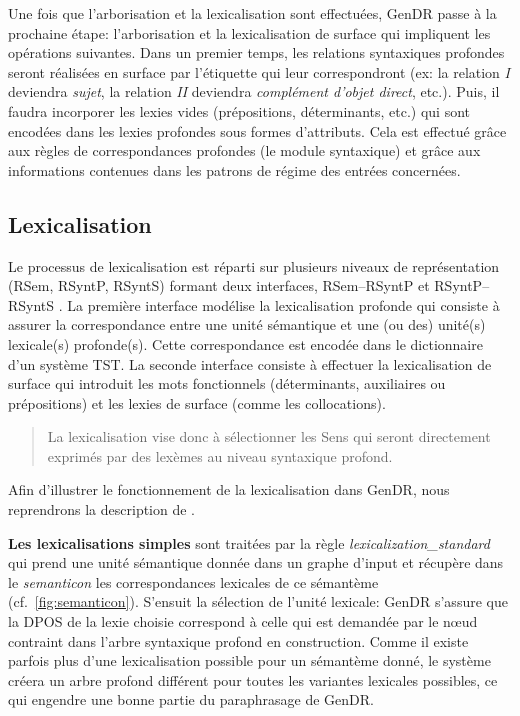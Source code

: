 Une fois que l'arborisation et la lexicalisation sont effectuées, GenDR passe à la prochaine étape: l'arborisation et la lexicalisation de surface qui impliquent les opérations suivantes. Dans un premier temps, les relations syntaxiques profondes seront réalisées en surface par l'étiquette qui leur correspondront (ex: la relation \emph{I} deviendra \emph{sujet}, la relation \emph{II} deviendra \emph{complément d'objet direct}, etc.). Puis, il faudra incorporer les lexies vides (prépositions, déterminants, etc.) qui sont encodées dans les lexies profondes sous formes d'attributs. Cela est effectué grâce aux règles de correspondances profondes (le module syntaxique) et grâce aux informations contenues dans les patrons de régime des entrées concernées.


\subsection{Lexicalisation}\label{sec:lexicalisation}

Le processus de lexicalisation est réparti sur plusieurs niveaux de représentation (\ac{RSem}, \ac{RSyntP}, \ac{RSyntS}) formant deux interfaces, \ac{RSem}--\ac{RSyntP} et \ac{RSyntP}--\ac{RSyntS} \citep{lareau18,PolguerePourmodelestratifie1998}. La première interface modélise la lexicalisation profonde qui consiste à assurer la correspondance entre une unité sémantique et une (ou des) unité(s) lexicale(s) profonde(s). Cette correspondance est encodée dans le dictionnaire d'un système \ac{TST}. La seconde interface consiste à effectuer la lexicalisation de surface qui introduit les mots fonctionnels (déterminants, auxiliaires ou prépositions) et les lexies de surface (comme les collocations).

\begin{quote}
La lexicalisation vise donc à sélectionner les Sens qui seront directement exprimés par des lexèmes au niveau syntaxique profond.
\end{quote}
\vspace{-\baselineskip}
\hfill
\cite[p.~154]{PolguereStructurationmisejeu1990}

Afin d'illustrer le fonctionnement de la lexicalisation dans GenDR, nous reprendrons la description de \cite{lareau18}.

\textbf{Les lexicalisations simples}
sont traitées par la règle \emph{lexicalization\_standard} qui prend une unité sémantique donnée dans un graphe d'input et récupère dans le \emph{semanticon} les correspondances lexicales de ce sémantème (cf.~\ref{fig:semanticon}). S'ensuit la sélection de l'unité lexicale: GenDR s'assure que la \ac{DPOS} de la lexie choisie correspond à celle qui est demandée par le n\oe{}ud contraint dans l'arbre syntaxique profond en construction. Comme il existe parfois plus d'une lexicalisation possible pour un sémantème donné, le système créera un arbre profond différent pour toutes les variantes lexicales possibles, ce qui engendre une bonne partie du paraphrasage de GenDR.

